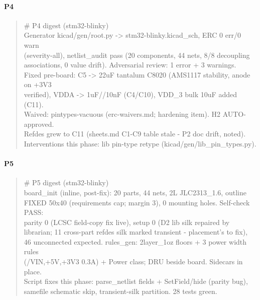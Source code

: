 \documentclass[11pt,a4paper]{article}
\begin{document}
\paragraph*{P4}
\begin{quote}\small\ttfamily\raggedright
\# P4 digest (stm32-blinky)\\
Generator kicad/gen/root.py -\textgreater{} stm32-blinky.kicad\_sch, ERC 0 err/0 warn\\
(severity-all), netlist\_audit pass (20 components, 44 nets, 8/8 decoupling\\
associations, 0 value drift). Adversarial review: 1 error + 3 warnings.\\
Fixed pre-board: C5 -\textgreater{} 22uF tantalum C8020 (AMS1117 stability, anode on +3V3\\
verified), VDDA -\textgreater{} 1uF//10nF (C4/C10), VDD\_3 bulk 10uF added (C11).\\
Waived: pintypes-vacuous (erc-waivers.md; hardening item). H2 AUTO-approved.\\
Refdes grew to C11 (sheets.md C1-C9 table stale - P2 doc drift, noted).\\
Interventions this phase: lib pin-type retype (kicad/gen/lib\_pin\_types.py).
\end{quote}
\paragraph*{P5}
\begin{quote}\small\ttfamily\raggedright
\# P5 digest (stm32-blinky)\\
board\_init (inline, post-fix): 20 parts, 44 nets, 2L JLC2313\_1.6, outline\\
FIXED 50x40 (requirements cap; margin 3), 0 mounting holes. Self-check PASS:\\
parity 0 (LCSC field-copy fix live), setup 0 (D2 lib silk repaired by\\
librarian; 11 cross-part refdes silk marked transient - placement's to fix),\\
46 unconnected expected. rules\_gen: 2layer\_1oz floors + 3 power width rules\\
(/VIN,+5V,+3V3 0.3A) + Power class; DRU beside board. Sidecars in place.\\
Script fixes this phase: parse\_netlist fields + SetField/hide (parity bug),\\
samefile schematic skip, transient-silk partition. 28 tests green.
\end{quote}
\end{document}
